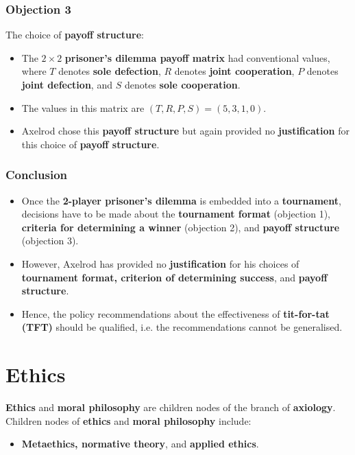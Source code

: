 \documentclass[11pt]{article}
\begin{document}
\subsubsection{Objection 3}
\label{sec:org44fd539}
The choice of \textbf{payoff structure}:
\begin{itemize}
\item The \(2 \times 2\) \textbf{prisoner's dilemma payoff matrix} had conventional values, where \(T\) denotes \textbf{sole defection}, \(R\) denotes \textbf{joint cooperation}, \(P\) denotes \textbf{joint defection}, and \(S\) denotes \textbf{sole cooperation}.
\item The values in this matrix are \((T, R, P, S) = (5, 3, 1, 0)\).
\item Axelrod chose this \textbf{payoff structure} but again provided no \textbf{justification} for this choice of \textbf{payoff structure}.
\end{itemize}
\subsubsection{Conclusion}
\label{sec:org9760427}
\begin{itemize}
\item Once the \textbf{2-player prisoner's dilemma} is embedded into a \textbf{tournament}, decisions have to be made about the \textbf{tournament format} (objection 1), \textbf{criteria for determining a winner} (objection 2), and \textbf{payoff structure} (objection 3).
\item However, Axelrod has provided no \textbf{justification} for his choices of \textbf{tournament format, criterion of determining success}, and \textbf{payoff structure}.
\item Hence, the policy recommendations about the effectiveness of \textbf{tit-for-tat (TFT)} should be qualified, i.e. the recommendations cannot be generalised.
\end{itemize}

 \newpage
\section{Ethics}
\label{sec:org803b5c4}
\textbf{Ethics} and \textbf{moral philosophy} are children nodes of the branch of \textbf{axiology}. Children nodes of \textbf{ethics} and \textbf{moral philosophy} include:
\begin{itemize}
\item \textbf{Metaethics, normative theory}, and \textbf{applied ethics}.
\end{itemize}
\end{document}
